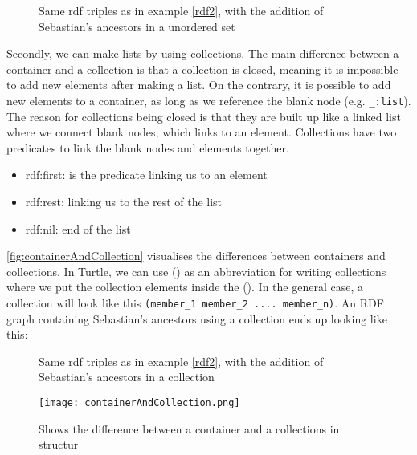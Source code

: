 \begin{figure}[h]
    \begin{example}
        Same rdf triples as in example \ref{rdf2}, with the addition of Sebastian's ancestors in a unordered set
    \end{example}
    
\end{figure}

\para
Secondly, we can make lists by using collections. The main difference between a container and a collection is that a collection is closed, meaning it is impossible to add new elements after making a list. On the contrary, it is possible to add new elements to a container, as long as we reference the blank node (e.g. \lstinline{_:list}). The reason for collections being closed is that they are built up like a linked list where we connect blank nodes, which links to an element. Collections have two predicates to link the blank nodes and elements together. 

\begin{itemize}
    \item rdf:first: is the predicate linking us to an element
    \item rdf:rest: linking us to the rest of the list
    \item rdf:nil: end of the list
\end{itemize}

\para
\autoref{fig:containerAndCollection} visualises the differences between containers and collections. In Turtle, we can use () as an abbreviation for writing collections where we put the collection elements inside the (). In the general case, a collection will look like this \lstinline{(member_1 member_2 .... member_n)}. An RDF graph containing Sebastian's ancestors using a collection ends up looking like this:

\begin{figure}[h]
    \begin{example}
        \label{rdfCollection}
        Same rdf triples as in example \ref{rdf2}, with the addition of Sebastian's ancestors in a collection
    \end{example}
    
\end{figure}


\begin{figure}
    \centering
    \texttt{[image: containerAndCollection.png]}
    \caption{Shows the difference between a container and a collections in structur}
    \label{fig:containerAndCollection}
\end{figure}


